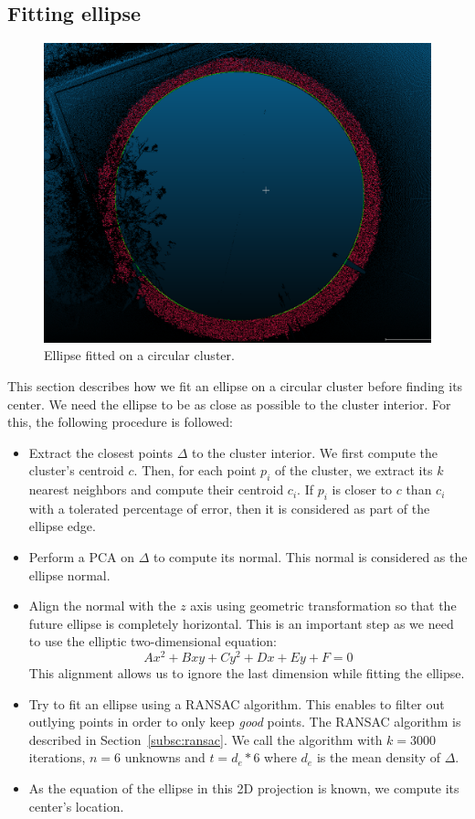 \subsection{Fitting ellipse}
\label{subsc:fit}
\begin{figure}[h]
  \centering
  \includegraphics[scale=0.4]{img/ellipse.png}
  \caption{Ellipse fitted on a circular cluster.}
  \label{fig:ellipse}
\end{figure}

This section describes how we fit an ellipse on a circular cluster before finding its center. We need the ellipse to be as close as possible to the cluster interior.
For this, the following procedure is followed:
\begin{itemize}
\item Extract the closest points $\Delta$ to the cluster interior. We first compute the cluster's centroid $c$. Then, for each point $p_i$ of the cluster, we extract its $k$ nearest neighbors and compute their centroid $c_i$. If $p_i$ is closer to $c$ than $c_i$ with a tolerated percentage of error, then it is considered as part of the ellipse edge.
\item Perform a PCA on $\Delta$ to compute its normal. This normal is considered as the ellipse normal.
\item Align the normal with the $z$ axis using geometric transformation so that the future ellipse is completely horizontal. This is an important step as we need to use the elliptic two-dimensional equation:
  \begin{equation}
    Ax^2 + Bxy + Cy^2 + Dx + Ey + F = 0
  \end{equation}
  This alignment allows us to ignore the last dimension while fitting the ellipse.
\item Try to fit an ellipse using a RANSAC algorithm. This enables to filter out outlying points in order to only keep \emph{good} points. The RANSAC algorithm is described in Section~\ref{subsc:ransac}. We call the algorithm with $k = 3000$ iterations, $n = 6$ unknowns and $t = d_e * 6$ where $d_e$ is the mean density of $\Delta$.
\item As the equation of the ellipse in this 2D projection is known, we compute its center's location.
\end{itemize}

